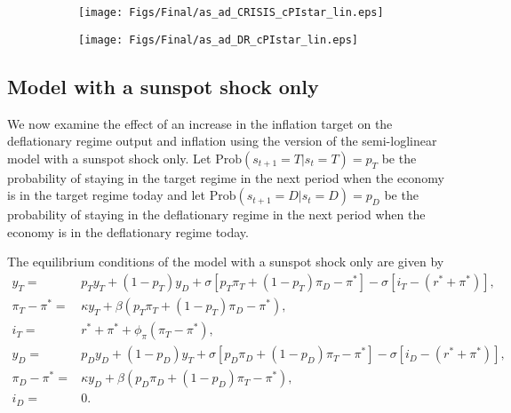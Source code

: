 \documentclass[11pt]{article}
\begin{document}
\begin{singlespace}
		\begin{figure}[h]
			\caption{AD and AS Curves in the Crisis State and in the Deflationary Regime\\---Semi-Loglinear Model---} \label{fig:ASAD_semi}
	        \vspace{-1em}
			\begin{center}
				\begin{subfigure}[b]{0.4\textwidth}
					\centering
					\texttt{[image: Figs/Final/as\_ad\_CRISIS\_cPIstar\_lin.eps]}
				\end{subfigure}
				\hspace{0.5cm}
				\begin{subfigure}[b]{0.42\textwidth}
					\centering
					\texttt{[image: Figs/Final/as\_ad\_DR\_cPIstar\_lin.eps]}
				\end{subfigure}
			\end{center}
		\end{figure}

		\subsection{Model with a sunspot shock only}

		We now examine the effect of an increase in the inflation target on the deflationary regime output and inflation using the version of the semi-loglinear model with a sunspot shock only. Let $\text{Prob}(s_{t+1}=T|s_{t}=T) = p_T$ be the probability of staying in the target regime in the next period when the economy is in the target regime today and let $\text{Prob}(s_{t+1}=D|s_{t}=D) = p_D$ be the probability of staying in the deflationary regime in the next period when the economy is in the deflationary regime today.

		\noindent The equilibrium conditions of the model with a sunspot shock only are given by
		\begin{align}
			y_{T} =& p_T y_T + (1-p_T)y_D +  \sigma\left[p_T \pi_T + (1-p_T)\pi_D - \pi^* \right] - \sigma\left[i_T - (r^* + \pi^*)\right],\label{ee_edlt}\\
			\pi_{T} - \pi^* =& \kappa y_T + \beta\left(p_T \pi_T + (1-p_T)\pi_D - \pi^*\right),\\
			i_T =& r^* + \pi^* + \phi_{\pi}(\pi_T - \pi^*),\\
			y_{D} =& p_D y_D + (1-p_D)y_T +  \sigma\left[p_D \pi_D + (1-p_D)\pi_T - \pi^*\right] - \sigma\left[i_D - (r^* + \pi^*)\right],\\
			\pi_{D} - \pi^* =& \kappa y_D + \beta\left(p_D \pi_D + (1-p_D)\pi_T - \pi^*\right),\\
			i_D =& 0. \label{i_edlt}
		\end{align}


\end{singlespace}
\end{document}

